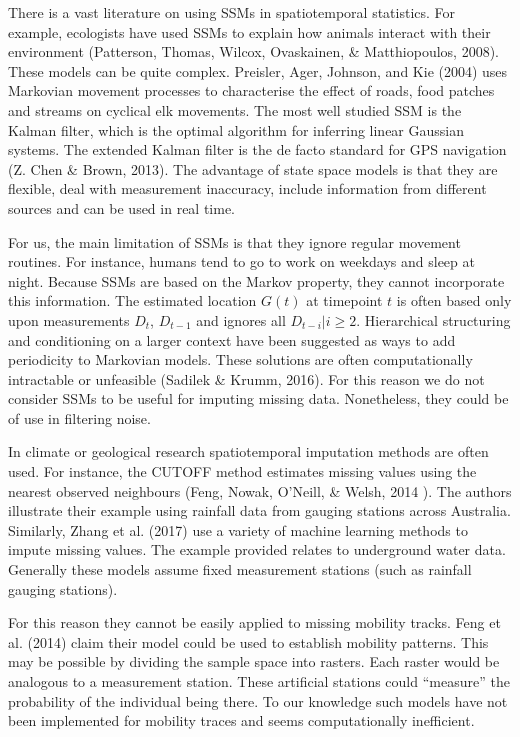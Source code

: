 \documentclass[english,man]{apa6}
\newcounter{author}
\theoremstyle{definition}
\theoremstyle{definition}
\theoremstyle{definition}
\theoremstyle{remark}
\begin{document}
There is a vast literature on using SSMs in spatiotemporal statistics.
For example, ecologists have used SSMs to explain how animals interact
with their environment (Patterson, Thomas, Wilcox, Ovaskainen, \&
Matthiopoulos, 2008). These models can be quite complex. Preisler, Ager,
Johnson, and Kie (2004) uses Markovian movement processes to
characterise the effect of roads, food patches and streams on cyclical
elk movements. The most well studied SSM is the Kalman filter, which is
the optimal algorithm for inferring linear Gaussian systems. The
extended Kalman filter is the de facto standard for GPS navigation (Z.
Chen \& Brown, 2013). The advantage of state space models is that they
are flexible, deal with measurement inaccuracy, include information from
different sources and can be used in real time.

For us, the main limitation of SSMs is that they ignore regular movement
routines. For instance, humans tend to go to work on weekdays and sleep
at night. Because SSMs are based on the Markov property, they cannot
incorporate this information. The estimated location \(G(t)\) at
timepoint \(t\) is often based only upon measurements \(D_t\),
\(D_{t-1}\) and ignores all \(D_{t-i}|i\geq2\). Hierarchical structuring
and conditioning on a larger context have been suggested as ways to add
periodicity to Markovian models. These solutions are often
computationally intractable or unfeasible (Sadilek \& Krumm, 2016). For
this reason we do not consider SSMs to be useful for imputing missing
data. Nonetheless, they could be of use in filtering noise.

In climate or geological research spatiotemporal imputation methods are
often used. For instance, the CUTOFF method estimates missing values
using the nearest observed neighbours (Feng, Nowak, O'Neill, \& Welsh,
2014 ). The authors illustrate their example using rainfall data from
gauging stations across Australia. Similarly, Zhang et al. (2017) use
a variety of machine learning methods to impute missing values. The
example provided relates to underground water data. Generally these
models assume fixed measurement stations (such as rainfall gauging
stations).

For this reason they cannot be easily applied to missing mobility
tracks. Feng et al. (2014) claim their model could be used to establish
mobility patterns. This may be possible by dividing the sample space
into rasters. Each raster would be analogous to a measurement station.
These artificial stations could \enquote{measure} the probability of the
individual being there. To our knowledge such models have not been
implemented for mobility traces and seems computationally inefficient.
\end{document}
